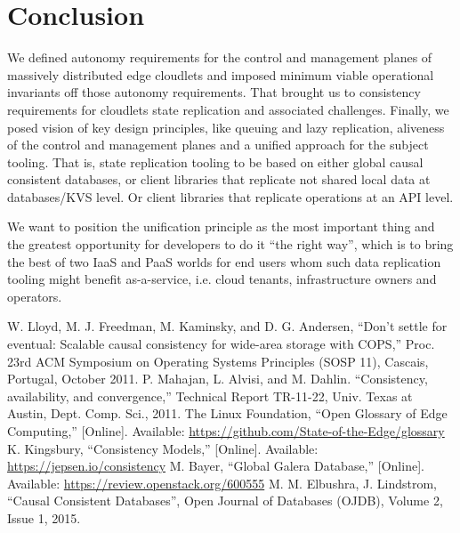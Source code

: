 \documentclass[conference]{IEEEtran}
\begin{document}
\section{Conclusion}

We defined autonomy requirements for the control and management planes of
massively distributed edge cloudlets and imposed minimum viable operational
invariants off those autonomy requirements. That brought us to consistency
requirements for cloudlets state replication and associated challenges.
Finally, we posed vision of key design principles, like queuing and lazy
replication, aliveness of the control and management planes and a unified
approach for the subject tooling. That is, state replication tooling to be
based on either global causal consistent databases, or client libraries that
replicate not shared local data at databases/KVS level. Or client libraries that
replicate operations at an API level.

We want to position the unification principle as the most important thing and
the greatest opportunity for developers to do it ``the right way'', which is to
bring the best of two IaaS and PaaS worlds for end users whom such data
replication tooling might benefit as-a-service, i.e. cloud tenants,
infrastructure owners and operators.

\begin{thebibliography}{00}
 W. Lloyd, M. J. Freedman, M. Kaminsky, and D. G. Andersen, ``Don’t settle for eventual: Scalable causal consistency for wide-area storage with COPS,'' Proc. 23rd ACM Symposium on Operating Systems Principles (SOSP 11), Cascais, Portugal, October 2011.
 P. Mahajan, L. Alvisi, and M. Dahlin. ``Consistency, availability, and convergence,'' Technical Report TR-11-22, Univ. Texas at Austin, Dept. Comp. Sci., 2011.
 The Linux Foundation, ``Open Glossary of Edge Computing,'' [Online]. Available: \url{https://github.com/State-of-the-Edge/glossary}
 K. Kingsbury, ``Consistency Models,'' [Online]. Available: \url{https://jepsen.io/consistency}
 M. Bayer, ``Global Galera Database,'' [Online]. Available: \url{https://review.openstack.org/600555}
 M. M. Elbushra, J. Lindstrom, ``Causal Consistent Databases'', Open Journal of Databases (OJDB), Volume 2, Issue 1, 2015.
\end{thebibliography}
\end{document}
